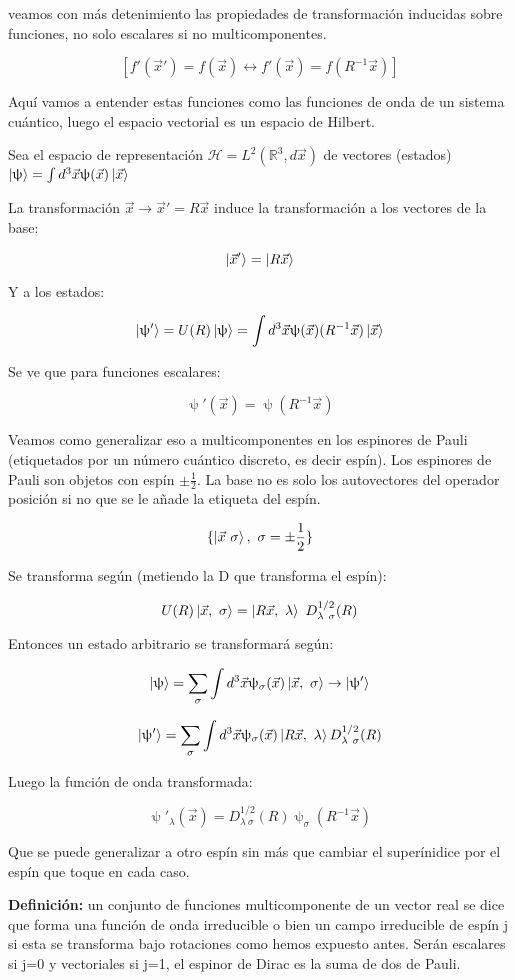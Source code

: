 \documentclass{article}
\begin{document}
        veamos con más detenimiento las propiedades de transformación inducidas sobre funciones, no solo escalares si no multicomponentes.

        $$[f'(\Vec{x}')=f(\Vec{x}) \leftrightarrow f'(\Vec{x})=f(R^{-1}\Vec{x})]$$

        Aquí vamos a entender estas funciones como las funciones de onda de un sistema cuántico, luego el espacio vectorial es un espacio de Hilbert.

        \smallskip
        Sea el espacio de representación $\mathcal{H}=L^2(\mathds{R}^3,d\Vec{x})$ de vectores (estados) $\ket{\uppsi}=\int d^3\Vec{x} \uppsi (\Vec{x})\ket{\Vec{x}}$

        La transformación $\Vec{x} \to \Vec{x}'=R\Vec{x}$ induce la transformación a los vectores de la base:

        $$\ket{\Vec{x}'}=\ket{R\Vec{x}}$$

        Y a los estados:

        $$\ket{\uppsi '}=U(R)\ket{\uppsi}=\int d^3\Vec{x} \uppsi (\Vec{x})(R^{-1}\Vec{x})\ket{\Vec{x}}$$

        Se ve que para funciones escalares:

        $$\uppsi '(\Vec{x})=\uppsi (R^{-1}\Vec{x})$$


         Veamos como generalizar eso a multicomponentes en los espinores de Pauli (etiquetados por un número cuántico discreto, es decir espín). Los espinores de Pauli son objetos con espín $\pm \frac{1}{2}$. La base no es solo los autovectores del operador posición si no que se le añade la etiqueta del espín.

         $$\{ \ket{\Vec{x} \ \sigma},  \ \sigma = \pm \frac{1}{2}\}$$

        Se transforma según (metiendo la D que transforma el espín):

        $$U(R)\ket{\Vec{x}, \ \sigma} = \ket{R\Vec{x}, \ \lambda} \ D_{\lambda \ \sigma}^{1/2}(R)$$

        Entonces un estado arbitrario se transformará según:

        $$\ket{\uppsi} = \sum _\sigma \int d^3\Vec{x} \uppsi _\sigma (\Vec{x}) \ket{\Vec{x}, \ \sigma} \to \ket{\uppsi '}$$

        $$\ket{\uppsi '}= \sum _\sigma \int d^3\Vec{x} \uppsi _\sigma (\Vec{x})\ket{R\Vec{x}, \ \lambda} D_{\lambda \ \sigma}^{1/2} (R)$$

        Luego la función de onda transformada:

        $$\uppsi '_\lambda (\Vec{x})= D^{1/2}_{\lambda \ \sigma}(R) \uppsi _\sigma (R^{-1}\Vec{x})$$

        Que se puede generalizar a otro espín sin más que cambiar el superínidice por el espín que toque en cada caso.

        \smallskip
        \textbf{Definición:} un conjunto de funciones multicomponente de un vector real se dice que forma una función de onda irreducible o bien un campo irreducible de espín j si esta se transforma bajo rotaciones como hemos expuesto antes. Serán escalares si j=0 y vectoriales si j=1, el espinor de Dirac es la suma de dos de Pauli.




        
\end{document}
